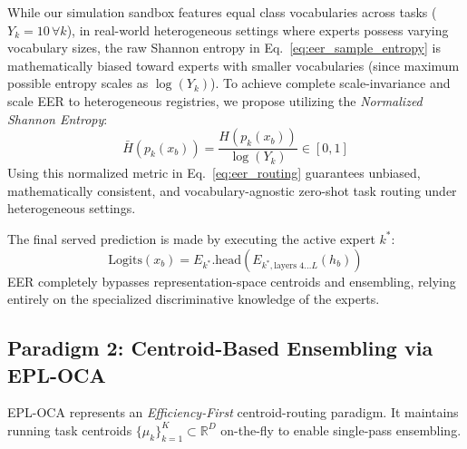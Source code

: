 While our simulation sandbox features equal class vocabularies across tasks ($Y_k = 10 \, \forall k$), in real-world heterogeneous settings where experts possess varying vocabulary sizes, the raw Shannon entropy in Eq.~\ref{eq:eer_sample_entropy} is mathematically biased toward experts with smaller vocabularies (since maximum possible entropy scales as $\log(Y_k)$). To achieve complete scale-invariance and scale EER to heterogeneous registries, we propose utilizing the \emph{Normalized Shannon Entropy}:
\begin{equation}
\bar{H}(p_k(x_b)) = \frac{H(p_k(x_b))}{\log(Y_k)} \in [0, 1]
\label{eq:normalized_entropy}
\end{equation}
Using this normalized metric in Eq.~\ref{eq:eer_routing} guarantees unbiased, mathematically consistent, and vocabulary-agnostic zero-shot task routing under heterogeneous settings.

The final served prediction is made by executing the active expert $k^*$:
\begin{equation}
\text{Logits}(x_b) = E_{k^*}.\text{head}(E_{k^*, \text{layers } 4 \dots L}(h_b))
\label{eq:eer_prediction}
\end{equation}
EER completely bypasses representation-space centroids and ensembling, relying entirely on the specialized discriminative knowledge of the experts.

\subsection{Paradigm 2: Centroid-Based Ensembling via EPL-OCA}
EPL-OCA represents an \emph{Efficiency-First} centroid-routing paradigm. It maintains running task centroids $\{\mu_k\}_{k=1}^K \subset \mathbb{R}^D$ on-the-fly to enable single-pass ensembling.


